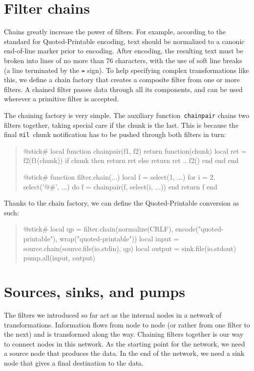 \documentclass[10pt]{article}
\newcommand{\nil}{\texttt{nil}}
\begin{document}
\section{Filter chains}

Chains greatly increase the power of filters.  For example,
according to the standard for Quoted-Printable encoding,
text should be normalized to a canonic end-of-line marker
prior to encoding.  After encoding, the resulting text must
be broken into lines of no more than 76 characters, with the
use of soft line breaks (a line terminated by the \texttt{=}
sign).  To help specifying complex transformations like
this, we define a chain factory that creates a composite
filter from one or more filters.  A chained filter passes
data through all its components, and can be used wherever a
primitive filter is accepted.

The chaining factory is very simple. The auxiliary
function~\texttt{chainpair} chains two filters together,
taking special care if the chunk is the last.  This is
because the final \nil\ chunk notification has to be
pushed through both filters in turn:  
\begin{quote}
\begin{lua}
@stick#
local function chainpair(f1, f2)
  return function(chunk)
    local ret = f2(f1(chunk))
    if chunk then return ret
    else return ret .. f2() end
  end
end
%

@stick#
function filter.chain(...)
  local f = select(1, ...) 
  for i = 2, select('@#', ...) do
    f = chainpair(f, select(i, ...))
  end
  return f
end
%
\end{lua}
\end{quote}

Thanks to the chain factory, we can
define the Quoted-Printable conversion as such:
\begin{quote}
\begin{lua}
@stick#
local qp = filter.chain(normalize(CRLF), encode("quoted-printable"), 
  wrap("quoted-printable"))
local input = source.chain(source.file(io.stdin), qp)
local output = sink.file(io.stdout)
pump.all(input, output)
%
\end{lua}
\end{quote}

\section{Sources, sinks, and pumps}

The filters we introduced so far act as the internal nodes
in a network of transformations. Information flows from node
to node (or rather from one filter to the next) and is
transformed along the way. Chaining filters together is our
way to connect nodes in this network. As the starting point
for the network, we need a source node that produces the
data. In the end of the network, we need a sink node that
gives a final destination to the data.
\end{document}

